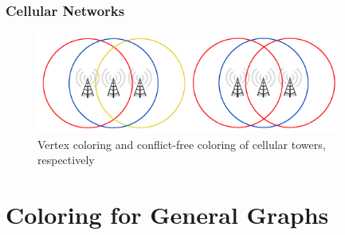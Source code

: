 \documentclass[xcolor=dvipsnames,aspectratio=1610]{beamer}
\begin{document}
  \begin{frame}
    \frametitle{Cellular Networks}

    \begin{figure}[h]
      \centering
      \includegraphics[width=10cm,trim=4 4 4 4,clip]{../figures/towers.pdf}
      \caption*{Vertex coloring and conflict-free coloring of cellular towers, respectively}
    \end{figure}


  \end{frame}





  \section{Coloring for General Graphs}
\end{document}
